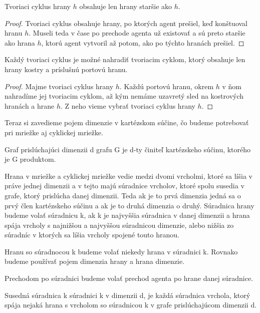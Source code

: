 \begin{lem}
Tvoriaci cyklus hrany $h$ obsahuje len hrany staršie ako $h$.
\end{lem}
\begin{proof}
Tvoriaci cyklus obsahuje hrany, po ktorých agent prešiel, keď konštuoval
hranu $h$. Museli teda v čase po prechode agenta už existovať a sú preto 
staršie ako hrana $h$, ktorú agent vytvoril až potom, ako po týchto hranách
prešiel.
\end{proof}


\begin{lem}
\label{cyklus}
Každý tvoriaci cyklus je možné nahradiť tvoriacim cyklom, ktorý obsahuje len
hrany kostry a príslušnú portovú hranu.
\end{lem}
\begin{proof}
Majme tvoriaci cyklus hrany $h$. Každú portovú hranu, okrem $h$  v ňom nahradíme 
jej tvoriacim
cyklom, až kým nemáme uzavretý sled na kostrových hranách a hrane $h$. Z
neho vieme vybrať tvoriaci cyklus hrany $h$.
\end{proof}


Teraz si zavedieme pojem dimenzie v kartézskom súčine, čo budeme potrebovať
pri mriežke aj cyklickej mriežke.

\begin{ozn}
Graf prislúchajúci dimenzii d grafu G je d-ty činiteľ kartézskeho súčinu, 
ktorého je G produktom.
\end{ozn}

\begin{ozn}
Hrana v mriežke a cyklickej mriežke vedie medzi dvomi vrcholmi, 
ktoré sa líšia v práve jednej dimenzii a v tejto majú súradnice vrcholov,
ktoré spolu susedia v grafe, ktorý prislúcha danej dimenzii. Teda ak je to
prvá dimenzia jedná sa o prvý člen kartézskeho súčinu a ak je to druhá
dimenzia o druhý. Súradnica hrany budeme volať súradnicu k, ak k je
najvyššia súradnica v danej dimenzii a hrana spája vrcholy s najnižšou a
najvyššou súradnicou dimenzie, alebo nižšia zo súradníc v ktorých sa líšia
vrcholy spojené touto hranou.

Hranu so súradnocou k budeme volať niekedy hrana v súradnici k. Rovnako
budeme používať pojem dimenzia hrany a hrana dimenzie.
\end{ozn}
\begin{ozn}
Prechodom po súradnici budeme volať prechod agenta po hrane danej súradnice.
\end{ozn}

\begin{ozn}
Susedná súradnica k súradnici k v dimenzii d, je každá súradnica vrchola,
ktorý
spája nejaká hrana s vrcholom so súradnicou k 
v grafe prislúchajúcom dimenzii d.
\end{ozn}



